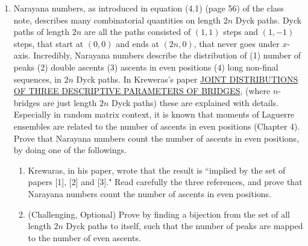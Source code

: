 \documentclass{article}
\begin{document}
\begin{enumerate}
    \item Narayana numbers, as introduced in equation (4.1) (page 56) of the class note, describes many combinatorial quantities on length $2n$ Dyck paths. Dyck paths of length $2n$ are all the paths consisted of $(1, 1)$ steps and $(1, -1)$ steps, that start at $(0, 0)$ and ends at $(2n, 0)$, that never goes under $x$-axis. Incredibly, Narayana numbers describe the distribution of (1) number of peaks (2) double ascents (3) ascents in even positions (4) long non-final sequences, in $2n$ Dyck paths. In Kreweras's paper \href{https://link.springer.com/content/pdf/10.1007/BFb0072516.pdf}{\color{blue} JOINT DISTRIBUTIONS OF THREE DESCRIPTIVE PARAMETERS OF BRIDGES}, (where $n$-bridges are just length $2n$ Dyck paths) these are explained with details. Especially in random matrix context, it is known that moments of Laguerre ensembles are related to the number of ascents in even positions (Chapter 4). Prove that Narayana numbers count the number of ascents in even positions, by doing one of the followings.
    \begin{enumerate}
        \item Krewaras, in his paper, wrote that the result is ``implied by the set of papers [1], [2] and [3]." Read carefully the three references, and prove that Narayana numbers count the number of ascents in even positions. 
        \item (Challenging, Optional) Prove by finding a bijection from the set of all length $2n$ Dyck paths to itself, such that the number of peaks are mapped to the number of even ascents. 
    \end{enumerate}
\end{enumerate}


 
\end{document}
